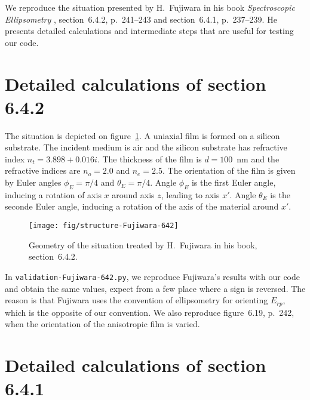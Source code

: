 

We reproduce the situation presented by H.~Fujiwara in his book \emph{Spectroscopic Ellipsometry} \cite{Fujiwara}, section~6.4.2, p.~241--243 and section~6.4.1, p.~237--239.
He presents detailed calculations and intermediate steps that are useful for testing our code.


\section{Detailed calculations of section 6.4.2}

The situation is depicted on figure~\ref{fig:situation642}.
A uniaxial film is formed on a silicon substrate.
The incident medium is air and the silicon substrate has refractive index $n_t = 3.898 + 0.016i$.
The thickness of the film is $d = 100$~nm and the refractive indices are $n_o = 2.0$ and $n_e=2.5$. 
The orientation of the film is given by Euler angles $\phi_E=\pi/4$ and $\theta_E = \pi/4$.
Angle $\phi_E$ is the first Euler angle, inducing a rotation of axis $x$ around axis $z$, leading to axis $x'$.
Angle $\theta_E$ is the seconde Euler angle, inducing a rotation of the axis of the material around $x'$.

\begin{figure}[b]
\texttt{[image: fig/structure-Fujiwara-642]}
\caption{\label{fig:situation642}Geometry of the situation treated by H.~Fujiwara in his book, section~6.4.2.}
\end{figure}

In \verb/validation-Fujiwara-642.py/, we reproduce Fujiwara's results with our code and obtain the same values, expect from a few place where a sign is reversed.
The reason is that Fujiwara uses the convention of ellipsometry for orienting $E_{rp}$, which is the opposite of our convention.
We also reproduce figure~6.19, p.~242, when the orientation of the anisotropic film is varied.

\vspace{10cm}
\mbox{}
\vspace{7cm}

\section{Detailed calculations of section 6.4.1}

